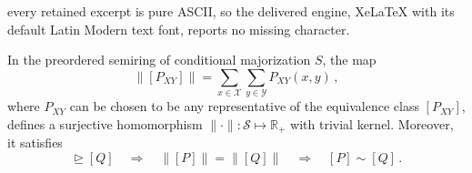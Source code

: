 \documentclass[10pt,a4paper]{amsart}
\newcommand{\cS}{\mathcal{S}}
\newcommand{\mc}[1]{\mathcal{#1}}
\newcommand{\rgeq}{\trianglerighteq}
\begin{document}
every retained excerpt is pure ASCII, so the delivered engine, XeLaTeX with its default Latin Modern text font, reports no missing character.
\begin{lemma}
\label{lem: degenerate and zig-zag}
In the preordered semiring of conditional majorization $S$, the map
\begin{equation}
\|[P_{XY}]\| = \sum_{x\in\mc X}\sum_{y\in\mc Y} P_{XY}(x,y) \,,
\end{equation}
where $P_{XY}$ can be chosen to be any representative of the equivalence class $[P_{XY}]$,
defines a surjective homomorphism $\|\cdot\| : \cS \mapsto \mathbb{R}_+$ with trivial kernel. Moreover, it satisfies
\begin{equation}
[P] \rgeq [Q] \quad \Rightarrow \quad \|[P]\| = \|[Q]\| \quad \Rightarrow\quad  [P] \sim [Q]\,.
\end{equation}
\end{lemma}
\end{document}
